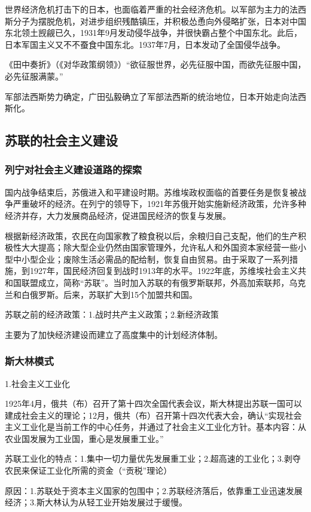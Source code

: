 世界经济危机打击下的日本，也面临着严重的社会经济危机。以军部为主力的法西斯分子为摆脱危机，对进步组织残酷镇压，并积极怂恿向外侵略扩张，日本对中国东北领土觊觎已久，1931年9月发动侵华战争，并很快霸占整个中国东北。此后，日本军国主义又不不蚕食中国东北。1937年7月，日本发动了全国侵华战争。

《田中奏折》（《对华政策纲领》）“欲征服世界，必先征服中国，而欲先征服中国，必先征服满蒙。”

军部法西斯势力确定，广田弘毅确立了军部法西斯的统治地位，日本开始走向法西斯化。

\subsection{苏联的社会主义建设}

\subsubsection{列宁对社会主义建设道路的探索}
国内战争结束后，苏俄进入和平建设时期。苏维埃政权面临的首要任务是恢复被战争严重破坏的经济。在列宁的领导下，1921年苏俄开始实施新经济政策，允许多种经济并存，大力发展商品经济，促进国民经济的恢复与发展。

根据新经济政策，农民在向国家教了粮食税以后，余粮归自己支配，他们的生产积极性大大提高；除大型企业仍然由国家管理外，允许私人和外国资本家经营一些小型中小型企业；废除生活必需品的配给制，恢复自由贸易。由于采取了一系列措施，到1927年，国民经济回复到战时1913年的水平。1922年底，苏维埃社会主义共和国联盟成立，简称“苏联”。当时加入苏联的有俄罗斯联邦，外高加索联邦，乌克兰和白俄罗斯。后来，苏联扩大到15个加盟共和国。

苏联之前的经济政策：1.战时共产主义政策；2.新经济政策

主要为了加快经济建设而建立了高度集中的计划经济体制。

\subsubsection{斯大林模式}
1.社会主义工业化

1925年4月，俄共（布）召开了第十四次全国代表会议，斯大林提出苏联一国可以建成社会主义的理论；12月，俄共（布）召开第十四次代表大会，确认“实现社会主义工业化是当前工作的中心任务，并通过了社会主义工业化方针。基本内容：从农业国发展为工业国，重心是发展重工业。”

苏联工业化的特点：1.集中一切力量优先发展重工业；2.超高速的工业化；3.剥夺农民来保证工业化所需的资金（“贡税”理论）

原因：1.苏联处于资本主义国家的包围中；2.苏联经济落后，依靠重工业迅速发展经济；3.斯大林认为从轻工业开始发展过于缓慢。

